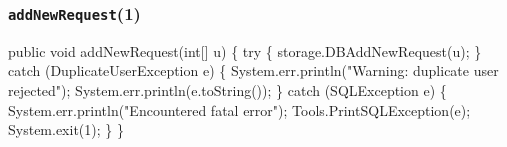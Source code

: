\documentclass{article}
\def\nwendcode{\endtrivlist \endgroup}      %
\begin{document}
\subsubsection{{\tt{}\protect{}addNewRequest}(1)}
\nwenddocs{}\endmoddef{}
public void addNewRequest(int[] u) \{
  try \{
    storage.DBAddNewRequest(u);
  \} catch (DuplicateUserException e) \{
    System.err.println("Warning: duplicate user rejected");
    System.err.println(e.toString());
  \} catch (SQLException e) \{
    System.err.println("Encountered fatal error");
    Tools.PrintSQLException(e);
    System.exit(1);
  \}
\}
\eatline
{}\nwendcode{}
\end{document}
